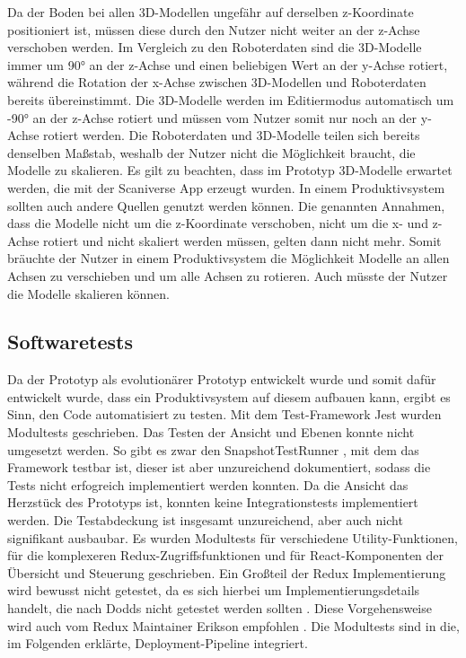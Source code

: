 Da der Boden bei allen 3D-Modellen ungefähr auf derselben z-Koordinate positioniert ist, müssen diese durch den Nutzer nicht weiter an der z-Achse verschoben werden. Im Vergleich zu den Roboterdaten sind die 3D-Modelle immer um 90° an der z-Achse und einen beliebigen Wert an der y-Achse rotiert, während die Rotation der x-Achse zwischen 3D-Modellen und Roboterdaten bereits übereinstimmt. Die 3D-Modelle werden im Editiermodus automatisch um -90° an der z-Achse rotiert und müssen vom Nutzer somit nur noch an der y-Achse rotiert werden. Die Roboterdaten und 3D-Modelle teilen sich bereits denselben Maßstab, weshalb der Nutzer nicht die Möglichkeit braucht, die Modelle zu skalieren. Es gilt zu beachten, dass im Prototyp 3D-Modelle erwartet werden, die mit der Scaniverse App erzeugt wurden. In einem Produktivsystem sollten auch andere Quellen genutzt werden können. Die genannten Annahmen, dass die Modelle nicht um die z-Koordinate verschoben, nicht um die x- und z-Achse rotiert und nicht skaliert werden müssen, gelten dann nicht mehr. Somit bräuchte der Nutzer in einem Produktivsystem die Möglichkeit Modelle an allen Achsen zu verschieben und um alle Achsen zu rotieren. Auch müsste der Nutzer die Modelle skalieren können.

\subsection{Softwaretests}
Da der Prototyp als evolutionärer Prototyp entwickelt wurde und somit dafür entwickelt wurde, dass ein Produktivsystem auf diesem aufbauen kann, ergibt es Sinn, den Code automatisiert zu testen. Mit dem Test-Framework Jest \cite{Jest} wurden Modultests geschrieben. Das Testen der \deckgl{} Ansicht und Ebenen konnte nicht umgesetzt werden. So gibt es zwar den Snap\-shot\-Test\-Run\-ner \cite{DeckglSnapshotTestRunner}, mit dem das Framework testbar ist, dieser ist aber unzureichend dokumentiert, sodass die Tests nicht erfogreich implementiert werden konnten. Da die \deckgl{} Ansicht das Herzstück des Prototyps ist, konnten keine Integrationstests implementiert werden. Die Testabdeckung ist insgesamt unzureichend, aber auch nicht signifikant ausbaubar. Es wurden Modultests für verschiedene Utility-Funktionen, für die komplexeren Redux-Zugriffsfunktionen und für React-Komponenten der Übersicht und Steuerung geschrieben. Ein Großteil der Redux Implementierung wird bewusst nicht getestet, da es sich hierbei um Implementierungsdetails handelt, die nach Dodds nicht getestet werden sollten \cite{Dodds}. Diese Vorgehensweise wird auch vom Redux Maintainer Erikson empfohlen \cite{Erikson}. Die Modultests sind in die, im Folgenden erklärte, Deployment-Pipeline integriert.

